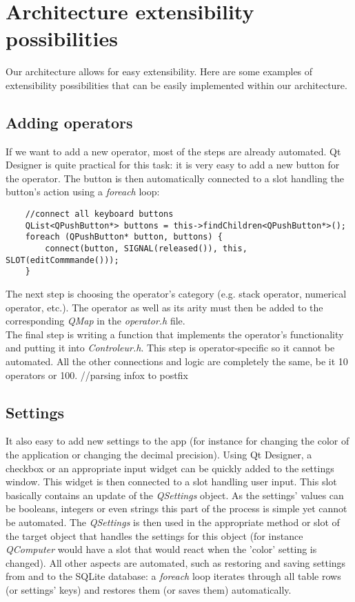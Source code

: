 \documentclass[titlepage]{article}
\begin{document}
\newpage
\section{Architecture extensibility possibilities}
	Our architecture allows for easy extensibility. Here are some examples of extensibility possibilities that can be easily implemented within our architecture.
	\subsection{Adding operators}
	If we want to add a new operator, most of the steps are already automated. Qt Designer is quite practical for this task: it is very easy to add a new button for the operator. The button is then automatically connected to a slot handling the button's action using a \textit{foreach} loop: 
	\begin{lstlisting}
    //connect all keyboard buttons
    QList<QPushButton*> buttons = this->findChildren<QPushButton*>();
    foreach (QPushButton* button, buttons) {
        connect(button, SIGNAL(released()), this, SLOT(editCommmande()));
    }
	\end{lstlisting}
	The next step is choosing the operator's category (e.g. stack operator, numerical operator, etc.). The operator as well as its arity must then be added to the corresponding \textit{QMap} in the \textit{operator.h} file. \\
	The final step is writing a function that implements the operator's functionality and putting it into \textit{Controleur.h}. This step is operator-specific so it cannot be automated. All the other connections and logic are completely the same, be it 10 operators or 100.
    //parsing infox to postfix
	\subsection{Settings}
	It also easy to add new settings to the app (for instance for changing the color of the application or changing the decimal precision). Using Qt Designer, a checkbox or an appropriate input widget can be quickly added to the settings window. This widget is then connected to a slot handling user input. This slot basically contains an update of the \textit{QSettings} object. As the settings' values can be booleans, integers or even strings this part of the process is simple yet cannot be automated. The \textit{QSettings} is then used in the appropriate method or slot of the target object that handles the settings for this object (for instance \textit{QComputer} would have a slot that would react when the 'color' setting is changed). All other aspects are automated, such as restoring and saving settings from and to the SQLite database: a \textit{foreach} loop iterates through all table rows (or settings' keys) and restores them (or saves them) automatically.
\end{document}
